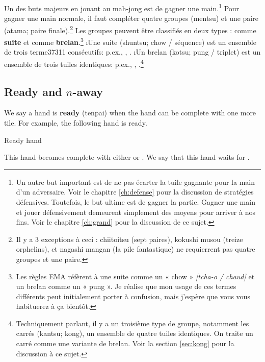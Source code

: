 Un des buts majeurs en jouant au mah-jong est de gagner une main.\footnote{Un autre but important est de ne pas écarter la tuile gagnante pour la main d'un adversaire. Voir le chapitre \ref{ch:defense} pour la discussion de stratégies défensives. Toutefois, le but ultime est de gagner la partie. Gagner une main et jouer défensivement demeurent simplement des moyens pour arriver à nos fins. Voir le chapitre \ref{ch:grand} pour la discussion de ce sujet.}
Pour gagner une main normale, il faut compléter quatre groupes ({\jap mentsu}) et une paire ({\jap atama}; paire finale).\footnote{Il y a 3 exceptions à ceci : {\jap chiitoitsu} (sept paires), {\jap kokushi musou} (treize orphelins), et {\jap nagashi mangan} (la pile fantastique) ne requierrent pas quatre groupes et une paire.} 
Les groupes peuvent être classifiés en deux types : comme {\bf suite} et comme {\bf brelan}.\footnote{Les règles EMA réfèrent à une suite comme un « chow » \textit{[tcha-o / chaud]} et un brelan comme un « pung ». Je réalise que mon usage de ces termes différents peut initialement porter à confusion, mais j'espère que vous vous habituerez à ça bientôt.}
\bi
\i Une suite ({\jap shuntsu}; chow / séquence) est un ensemble de trois terme37311 consécutifs: p.ex., {\LARGE {}}, {\LARGE {}}. 
\i Un brelan ({\jap kotsu}; pung / triplet) est un ensemble de trois tuiles identiques: p.ex., {\LARGE {}}, {\LARGE \fa\fa\fa}.\footnote{Techniquement parlant, il y a un troisième type de groupe, notamment les carrés ({\jap kantsu}; kong), un ensemble de quatre tuiles identiques. On traite un carré comme une variante de brelan. Voir la section \ref{sec:kong} pour la discussion à ce sujet.} 
\ei
 

\subsection{Ready and $n$-away}
	 
We say a hand is {\bf ready} ({\jap tenpai}) when the hand can be complete with one more tile. For example, the following hand is ready. 
\bigskip
\begin{itembox}[r]{Ready hand}
\bp
{}\zhong\zhong\zhong
\ep
\end{itembox}
This hand becomes complete with either {\LARGE{}} or {\LARGE{}}. We say that this hand waits for {\LARGE{} }.

